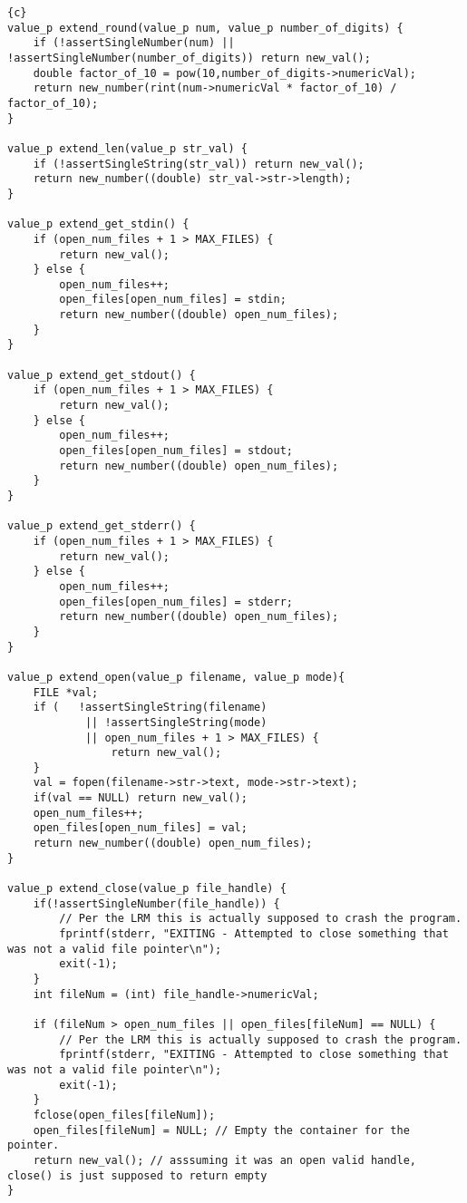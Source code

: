 \begin{lstlisting}{c}
value_p extend_round(value_p num, value_p number_of_digits) {
	if (!assertSingleNumber(num) || !assertSingleNumber(number_of_digits)) return new_val();
	double factor_of_10 = pow(10,number_of_digits->numericVal);
	return new_number(rint(num->numericVal * factor_of_10) / factor_of_10);
}

value_p extend_len(value_p str_val) {
	if (!assertSingleString(str_val)) return new_val();
	return new_number((double) str_val->str->length);
}

value_p extend_get_stdin() {
	if (open_num_files + 1 > MAX_FILES) {
		return new_val();
	} else {
		open_num_files++;
		open_files[open_num_files] = stdin;
		return new_number((double) open_num_files);
	}
}

value_p extend_get_stdout() {
	if (open_num_files + 1 > MAX_FILES) {
		return new_val();
	} else {
		open_num_files++;
		open_files[open_num_files] = stdout;
		return new_number((double) open_num_files);
	}
}

value_p extend_get_stderr() {
	if (open_num_files + 1 > MAX_FILES) {
		return new_val();
	} else {
		open_num_files++;
		open_files[open_num_files] = stderr;
		return new_number((double) open_num_files);
	}
}

value_p extend_open(value_p filename, value_p mode){
	FILE *val;
	if (   !assertSingleString(filename)
			|| !assertSingleString(mode)
			|| open_num_files + 1 > MAX_FILES) {
				return new_val();
	}
	val = fopen(filename->str->text, mode->str->text);
	if(val == NULL) return new_val();
	open_num_files++;
	open_files[open_num_files] = val;
	return new_number((double) open_num_files);
}

value_p extend_close(value_p file_handle) {
	if(!assertSingleNumber(file_handle)) {
		// Per the LRM this is actually supposed to crash the program.
		fprintf(stderr, "EXITING - Attempted to close something that was not a valid file pointer\n");
		exit(-1);
	}
	int fileNum = (int) file_handle->numericVal;

	if (fileNum > open_num_files || open_files[fileNum] == NULL) {
		// Per the LRM this is actually supposed to crash the program.
		fprintf(stderr, "EXITING - Attempted to close something that was not a valid file pointer\n");
		exit(-1);
	}
	fclose(open_files[fileNum]);
	open_files[fileNum] = NULL; // Empty the container for the pointer.
	return new_val(); // asssuming it was an open valid handle, close() is just supposed to return empty
}


\end{lstlisting}
